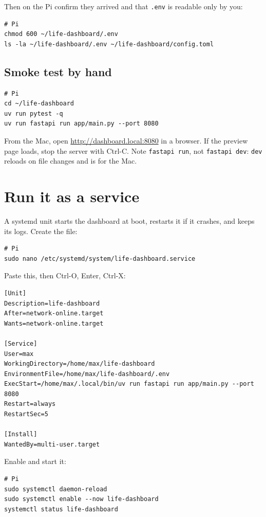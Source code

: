 \documentclass[11pt,letterpaper]{article}
\newcommand{\cmd}[1]{\texttt{#1}}
\begin{document}
Then on the Pi confirm they arrived and that \cmd{.env} is readable only by you:

\begin{lstlisting}
# Pi
chmod 600 ~/life-dashboard/.env
ls -la ~/life-dashboard/.env ~/life-dashboard/config.toml
\end{lstlisting}

\subsection{Smoke test by hand}

\begin{lstlisting}
# Pi
cd ~/life-dashboard
uv run pytest -q
uv run fastapi run app/main.py --port 8080
\end{lstlisting}

From the Mac, open \url{http://dashboard.local:8080} in a browser. If the preview page loads, stop the server with Ctrl-C. Note \cmd{fastapi run}, not \cmd{fastapi dev}: \cmd{dev} reloads on file changes and is for the Mac.

\section{Run it as a service}

A systemd unit starts the dashboard at boot, restarts it if it crashes, and keeps its logs. Create the file:

\begin{lstlisting}
# Pi
sudo nano /etc/systemd/system/life-dashboard.service
\end{lstlisting}

Paste this, then Ctrl-O, Enter, Ctrl-X:

\begin{lstlisting}
[Unit]
Description=life-dashboard
After=network-online.target
Wants=network-online.target

[Service]
User=max
WorkingDirectory=/home/max/life-dashboard
EnvironmentFile=/home/max/life-dashboard/.env
ExecStart=/home/max/.local/bin/uv run fastapi run app/main.py --port 8080
Restart=always
RestartSec=5

[Install]
WantedBy=multi-user.target
\end{lstlisting}

Enable and start it:

\begin{lstlisting}
# Pi
sudo systemctl daemon-reload
sudo systemctl enable --now life-dashboard
systemctl status life-dashboard
\end{lstlisting}
\end{document}
